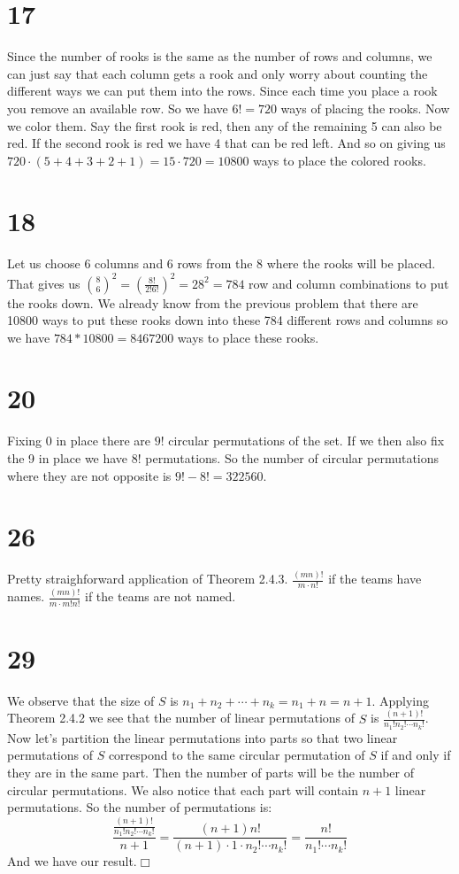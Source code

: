 \documentclass{article}
\begin{document}
\section*{17}
Since the number of rooks is the same as the number of rows and columns, we can just say that each column gets a rook and only worry about counting the different ways we can put them into the rows. Since each time you place a rook you remove an available row. So we have $6!=720$ ways of placing the rooks. Now we color them. Say the first rook is red, then any of the remaining 5 can also be red. If the second rook is red we have 4 that can be red left. And so on giving us $720\cdot(5+4+3+2+1)=15\cdot720=10800$ ways to place the colored rooks.
\section*{18}
Let us choose 6 columns and 6 rows from the 8 where the rooks will be placed. That gives us ${8 \choose 6}^2=(\frac{8!}{2!6!})^2=28^2=784$ row and column combinations to put the rooks down. We already know from the previous problem that there are 10800 ways to put these rooks down into these 784 different rows and columns so we have $784*10800=8467200$ ways to place these rooks.
\section*{20}
Fixing 0 in place there are $9!$ circular permutations of the set. If we then also fix the 9 in place we have $8!$ permutations. So the number of circular permutations where they are not opposite is $9!-8!=322560$.
\section*{26}
Pretty straighforward application of Theorem 2.4.3. $\frac{(mn)!}{m\cdot n!}$ if the teams have names. $\frac{(mn)!}{m\cdot m!n!}$ if the teams are not named.
\section*{29}
We observe that the size of $S$ is $n_1+n_2+\cdots+n_k=n_1+n=n+1$. Applying Theorem 2.4.2 we see that the number of linear permutations of $S$ is $\frac{(n+1)!}{n_1!n_2!\cdots n_k!}$. Now let's partition the linear permutations into parts so that two linear permutations of $S$ correspond to the same circular permutation of $S$ if and only if they are in the same part. Then the number of parts will be the number of circular permutations. We also notice that each part will contain $n+1$ linear permutations. So the number of permutations is:
\[\frac{\frac{(n+1)!}{n_1!n_2!\cdots n_k!}}{n+1}=\frac{(n+1)n!}{(n+1)\cdot 1\cdot n_2!\cdots n_k!}=\frac{n!}{n_1!\cdots n_k!}\]
And we have our result.$\Box$
\end{document}
